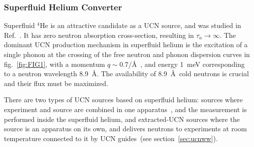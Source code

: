 \subsubsection{Superfluid Helium Converter}

Superfluid $^4$He is an attractive candidate as a UCN source, and was
studied in Ref.~\cite{Golub77}. It has zero neutron absorption
cross-section, resulting in $\tau_a \rightarrow \infty$. The dominant
UCN production mechanism in superfluid helium is the excitation of a
single phonon at the crossing of the free neutron and phonon
dispersion curves in fig.~\ref{fig:FIG1}, with a momentum
$q\sim 0.7$/\AA~\cite{Brome2001}, and energy 1~meV corresponding to a
neutron wavelength 8.9~\AA. The availability of 8.9~\AA~cold neutrons
is crucial and their flux must be maximized.


There are two types of UCN sources based on superfluid helium: sources
where experiment and source are combined in one
apparatus~\cite{van2009cryoedm, huffman2000magnetic}, and the
measurement is performed inside the superfluid helium, and
extracted-UCN sources where the source is an apparatus on its own, and
delivers neutrons to experiments at room temperature connected to it
by UCN guides~(see section~\ref{sec:ucnww}).



